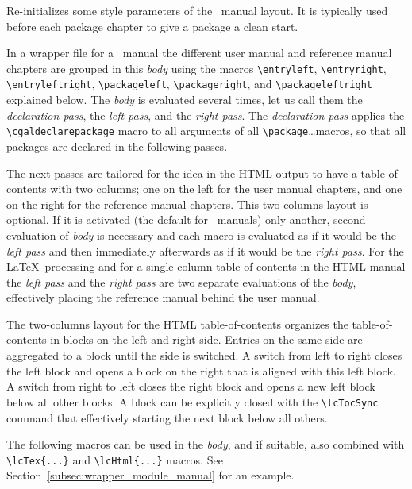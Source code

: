 \begin{description}
    Re-initializes some style parameters of the \CC\ manual layout. It
    is typically used before each package chapter to give a package a
    clean start.

    In a wrapper file for a \cgal\ manual the different user manual
    and reference manual chapters are grouped in this \emph{body\/} using the
    macros \verb|\entryleft|, \verb|\entryright|, \verb|\entryleftright|, 
    \verb|\packageleft|, \verb|\packageright|, and
    \verb|\packageleftright| explained below. The \emph{body\/} is
    evaluated several times, let us call them the \emph{declaration pass},
    the \emph{left pass}, and the \emph{right pass}. The \emph{declaration 
      pass\/} applies the \verb|\cgaldeclarepackage| macro to all arguments 
    of all \verb|\package|\ldots macros, so that all packages are declared in
    the following passes. 

    The next passes are tailored for the
    idea in the HTML output to have a table-of-contents with two
    columns; one on the left for the user manual chapters, and one on
    the right for the reference manual chapters. This two-columns
    layout is optional. If it is activated (the default for \cgal\
    manuals) only another, second evaluation of \emph{body\/} is
    necessary and each macro is evaluated as if it would be the
    \emph{left pass} and then immediately afterwards as if it would be
    the \emph{right pass}. For the \LaTeX\ processing and for a single-column
    table-of-contents in the HTML manual the \emph{left pass} and the
    \emph{right pass} are two separate evaluations of the \emph{body},
    effectively placing the reference manual behind the user manual.

    The two-columns layout for the HTML table-of-contents organizes
    the table-of-contents in blocks on the left and right
    side. Entries on the same side are aggregated to a block until the
    side is switched. A switch from left to right closes the left
    block and opens a block on the right that is aligned with this left block.
    A switch from right to left closes the right block and opens a new
    left block below all other blocks.
    A block can be explicitly closed with the \verb|\lcTocSync|
    command that effectively starting the next block below all others.

    The following macros can be used in the \emph{body}, and if
    suitable, also combined with \verb|\lcTex{...}| and
    \verb|\lcHtml{...}| macros. See Section~\ref{subsec:wrapper_module_manual} 
    for an example. 


\end{description}
